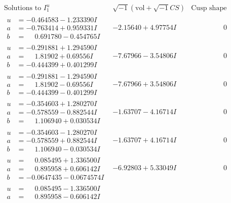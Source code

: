 \documentclass[1p]{elsarticle_modified}
\theoremstyle{definition}
\newcommand{\I}{\sqrt{-1}}
\begin{document}
$$\begin{array}{c|c|c}
\text{Solutions to }I^u_{1}& \I (\text{vol} + \sqrt{-1}CS) & \text{Cusp shape}\\
 \hline 
\begin{aligned}
u &= -0.464583 - 1.233390 I \\
a &= -0.763414 + 0.959331 I \\
b &= \phantom{-}0.691780 - 0.454765 I\end{aligned}
 & -2.15640 + 4.97754 I & \phantom{-0.000000 } 0 \\ \hline\begin{aligned}
u &= -0.291881 + 1.294590 I \\
a &= \phantom{-}1.81902 + 0.69556 I \\
b &= -0.444399 + 0.401299 I\end{aligned}
 & -7.67966 - 3.54806 I & \phantom{-0.000000 } 0 \\ \hline\begin{aligned}
u &= -0.291881 - 1.294590 I \\
a &= \phantom{-}1.81902 - 0.69556 I \\
b &= -0.444399 - 0.401299 I\end{aligned}
 & -7.67966 + 3.54806 I & \phantom{-0.000000 } 0 \\ \hline\begin{aligned}
u &= -0.354603 + 1.280270 I \\
a &= -0.578559 - 0.882544 I \\
b &= \phantom{-}1.106940 + 0.030534 I\end{aligned}
 & -1.63707 - 4.16714 I & \phantom{-0.000000 } 0 \\ \hline\begin{aligned}
u &= -0.354603 - 1.280270 I \\
a &= -0.578559 + 0.882544 I \\
b &= \phantom{-}1.106940 - 0.030534 I\end{aligned}
 & -1.63707 + 4.16714 I & \phantom{-0.000000 } 0 \\ \hline\begin{aligned}
u &= \phantom{-}0.085495 + 1.336500 I \\
a &= \phantom{-}0.895958 + 0.606142 I \\
b &= -0.0647435 - 0.0674574 I\end{aligned}
 & -6.92803 + 5.33049 I & \phantom{-0.000000 } 0 \\ \hline\begin{aligned}
u &= \phantom{-}0.085495 - 1.336500 I \\
a &= \phantom{-}0.895958 - 0.606142 I \\

\end{aligned}
\end{array}$$
\end{document}
